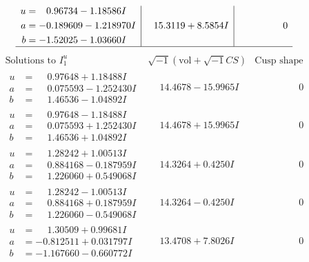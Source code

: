 \documentclass[1p]{elsarticle_modified}
\theoremstyle{definition}
\newcommand{\I}{\sqrt{-1}}
\begin{document}
$$\begin{array}{c|c|c}
\begin{aligned}
u &= \phantom{-}0.96734 - 1.18586 I \\
a &= -0.189609 - 1.218970 I \\
b &= -1.52025 - 1.03660 I\end{aligned}
 & \phantom{-}15.3119 + 8.5854 I & \phantom{-0.000000 } 0\\
 \hline 
 \end{array}$$\newpage$$\begin{array}{c|c|c}  
\text{Solutions to }I^u_{1}& \I (\text{vol} + \sqrt{-1}CS) & \text{Cusp shape}\\
 \hline 
\begin{aligned}
u &= \phantom{-}0.97648 + 1.18488 I \\
a &= \phantom{-}0.075593 - 1.252430 I \\
b &= \phantom{-}1.46536 - 1.04892 I\end{aligned}
 & \phantom{-}14.4678 - 15.9965 I & \phantom{-0.000000 } 0 \\ \hline\begin{aligned}
u &= \phantom{-}0.97648 - 1.18488 I \\
a &= \phantom{-}0.075593 + 1.252430 I \\
b &= \phantom{-}1.46536 + 1.04892 I\end{aligned}
 & \phantom{-}14.4678 + 15.9965 I & \phantom{-0.000000 } 0 \\ \hline\begin{aligned}
u &= \phantom{-}1.28242 + 1.00513 I \\
a &= \phantom{-}0.884168 - 0.187959 I \\
b &= \phantom{-}1.226060 + 0.549068 I\end{aligned}
 & \phantom{-}14.3264 + 0.4250 I & \phantom{-0.000000 } 0 \\ \hline\begin{aligned}
u &= \phantom{-}1.28242 - 1.00513 I \\
a &= \phantom{-}0.884168 + 0.187959 I \\
b &= \phantom{-}1.226060 - 0.549068 I\end{aligned}
 & \phantom{-}14.3264 - 0.4250 I & \phantom{-0.000000 } 0 \\ \hline\begin{aligned}
u &= \phantom{-}1.30509 + 0.99681 I \\
a &= -0.812511 + 0.031797 I \\
b &= -1.167660 - 0.660772 I\end{aligned}
 & \phantom{-}13.4708 + 7.8026 I & \phantom{-0.000000 } 0 \\ \hline\begin{aligned}

\end{aligned}
\end{array}$$
\end{document}
